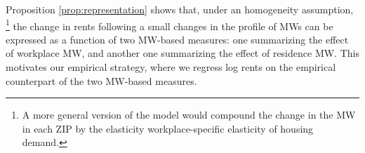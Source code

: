Proposition \ref{prop:representation} shows that, under an homogeneity assumption,%
\footnote{A more general version of the model would compound the change in the MW
in each ZIP by the elasticity workplace-specific elasticity of housing demand.}
the change in rents following a small changes in the profile of MWs can be expressed 
as a function of two MW-based measures: one summarizing the effect of workplace MW,
and another one summarizing the effect of residence MW.
This motivates our empirical strategy, where we regress log rents on the empirical
counterpart of the two MW-based measures.

